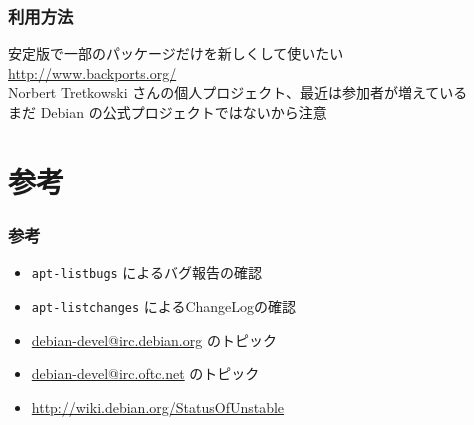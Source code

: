 \documentclass[cjk,dvipdfmx]{beamer}
\begin{document}
 \begin{frame}
  \frametitle{利用方法}
  安定版で一部のパッケージだけを新しくして使いたい\\
  \url{http://www.backports.org/}\\
  Norbert Tretkowski さんの個人プロジェクト、最近は参加者が増えている\\
  まだ Debian の公式プロジェクトではないから注意
 \end{frame}
 
 \section{参考}
 \begin{frame}
  \frametitle{参考}
  \begin{itemize}
   \item  \texttt{apt-listbugs} によるバグ報告の確認
   \item  \texttt{apt-listchanges} によるChangeLogの確認
   \item  \url{debian-devel@irc.debian.org} のトピック
   \item  \url{debian-devel@irc.oftc.net} のトピック
   \item  \url{http://wiki.debian.org/StatusOfUnstable}
  \end{itemize}
 \end{frame}
 
\end{document}
